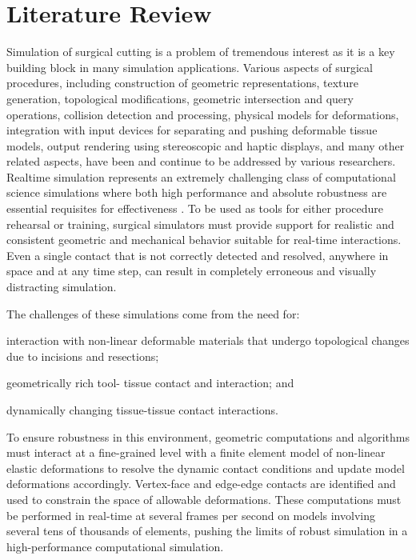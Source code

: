 
\chapter{Literature Review}\label{chp:literature}

Simulation of surgical cutting is a problem of tremendous interest as it is a key building block in many simulation applications. Various aspects of surgical procedures, including construction of geometric representations, texture generation, topological modifications, geometric intersection and query operations, collision detection and processing, physical models for deformations, integration with input devices for separating and pushing deformable tissue models, output rendering using  stereoscopic and haptic displays, and many other related aspects, have been and continue to be addressed by various researchers. Realtime simulation represents an extremely challenging class of computational science simulations where both high performance and absolute robustness are essential requisites for effectiveness \autocite{younes:cbm:2013}. To be used as tools for either procedure rehearsal or training, surgical simulators must provide support for realistic and consistent geometric and mechanical behavior \autocite{farhat:hsmr:2012} suitable for real-time interactions. Even a single contact that is not correctly detected and resolved, anywhere in space and at any time step, can result in completely erroneous and visually distracting simulation.

The challenges of these simulations come from the need for:
\begin{enumerate*}[(1)]
  \item interaction with non-linear deformable materials that undergo topological changes due to incisions and resections;
  \item geometrically rich tool-
tissue contact and interaction; and
  \item dynamically changing tissue-tissue contact interactions.
\end{enumerate*}
To ensure robustness in this environment, geometric computations and algorithms must interact at a fine-grained level with a finite element model of non-linear elastic deformations to resolve the dynamic contact conditions and update model deformations accordingly. Vertex-face and edge-edge contacts are identified and used to constrain the space of allowable deformations. These computations must be performed in real-time at several frames per second on models involving several tens of thousands of elements, pushing the limits of robust simulation in a high-performance computational simulation.

